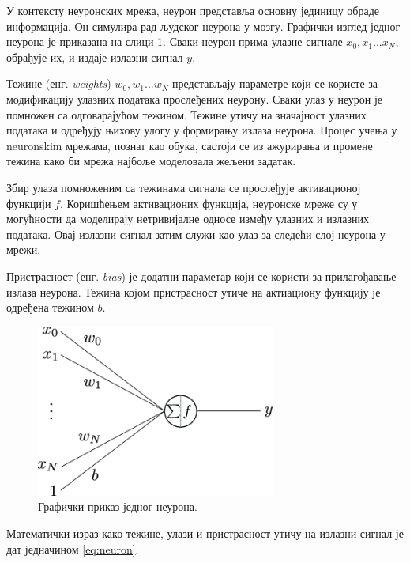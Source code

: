 \documentclass[a4paper, 12pt, master, utf8]{etf}
\begin{document}
У контексту неуронских мрежа, неурон представља основну јединицу обраде информација. 
Он симулира рад људског неурона у мозгу. Графички изглед једног неурона је приказана на слици \ref{fig:neuron}. Сваки неурон прима улазне сигнале $x_0, x_1 ... x_N$, обрађује их, и издаје излазни сигнал $y$. 
\newline

Тежине (енг. \textit{weights}) $w_0, w_1 ... w_N$ представљају параметре који се користе за модификацију улазних података прослеђених неурону. Сваки улаз у неурон је помножен са одговарајућом тежином. Тежине утичу на значајност улазних података и одређују њихову улогу у 
формирању излаза неурона. Процес учења у neuronskim мрежама, познат као обука, састоји се из ажурирања и промене тежина како би мрежа најбоље моделовала жељени задатак.
\newline

Збир улаза помноженим са тежинама сигнала се прослеђује активационој функцији $f$. 
Коришћењем активационих функција, неуронске мреже су у могућности да моделирају нетривијалне односе између улазних и излазних података. Овај излазни сигнал затим служи као улаз за следећи слој неурона у мрежи.
\newline

Пристрасност (енг. \textit{bias}) је додатни параметар који се користи за прилагођавање излаза неурона. Тежина којом пристрасност утиче на актиациону функцију је одређена тежином $b$.
\newline

\begin{figure}[h]
    \centering
    \includegraphics[width=0.7\textwidth]{images/neuron.png}
    \caption{Графички приказ једног неурона. \cite{ioannou_structural_2017}}
    \label{fig:neuron}
\end{figure}

Математички израз како тежине, улази и пристрасност утичу на излазни сигнал је дат једначином \ref{eq:neuron}.
\newline
\end{document}
